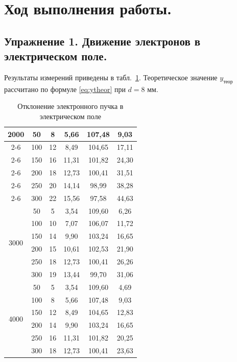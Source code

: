 \documentclass[12pt, a4paper]{article}
\begin{document}
	\section{Ход выполнения работы.}
	
	\subsection{Упражнение 1. Движение электронов в электрическом поле.}
	Результаты измерений приведены в табл.~\ref{tab:ex1}. Теоретическое значение $y_{\text{теор}}$ рассчитано по формуле \eqref{eq:ytheor} при $d = 8$ мм.
	
	\begin{table}[H]
		\caption{Отклонение электронного пучка в электрическом поле}
		\label{tab:ex1}
		\centering
		\small
		\begin{tabular}{|c|c|c|c|c|c|}
			\hline
			\multirow{6}{*}{2000} & 50 & 8 & 5,66 & 107,48 & 9,03 \\ \cline{2-6}
			& 100 & 12 & 8,49 & 104,65 & 17,11 \\ \cline{2-6}
			& 150 & 16 & 11,31 & 101,82 & 24,30 \\ \cline{2-6}
			& 200 & 18 & 12,73 & 100,41 & 31,51 \\ \cline{2-6}
			& 250 & 20 & 14,14 & 98,99 & 38,28 \\ \cline{2-6}
			& 300 & 22 & 15,56 & 97,58 & 44,63 \\ \hline
			\multirow{6}{*}{3000} & 50 & 5 & 3,54 & 109,60 & 6,26 \\ \cline{2-6}
			& 100 & 10 & 7,07 & 106,07 & 11,72 \\ \cline{2-6}
			& 150 & 14 & 9,90 & 103,24 & 16,65 \\ \cline{2-6}
			& 200 & 15 & 10,61 & 102,53 & 21,90 \\ \cline{2-6}
			& 250 & 18 & 12,73 & 100,41 & 26,26 \\ \cline{2-6}
			& 300 & 19 & 13,44 & 99,70 & 31,06 \\ \hline
			\multirow{6}{*}{4000} & 50 & 5 & 3,54 & 109,60 & 4,69 \\ \cline{2-6}
			& 100 & 8 & 5,66 & 107,48 & 9,03 \\ \cline{2-6}
			& 150 & 12 & 8,49 & 104,65 & 12,83 \\ \cline{2-6}
			& 200 & 14 & 9,90 & 103,24 & 16,65 \\ \cline{2-6}
			& 250 & 16 & 11,31 & 101,82 & 20,25 \\ \cline{2-6}
			& 300 & 18 & 12,73 & 100,41 & 23,63 \\ \hline
		\end{tabular}
	\end{table}
	
\end{document}
